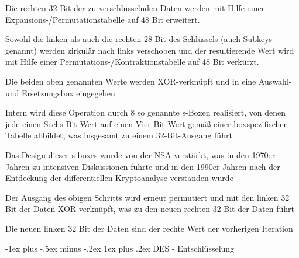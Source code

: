 \documentclass[a4paper]{article}
\makeatletter
\renewcommand{\subsubsection}{\@startsection{subsubsection}{3}{0mm}%
 {-1ex plus -.5ex minus -.2ex}%
 {1ex plus .2ex}%
 {\normalfont\small\bfseries}}
\makeatother
\begin{document}
\begin{multicols}{3}
      \begin{itemize*}
            \item Die rechten 32 Bit der zu verschlüsselnden Daten werden mit Hilfe
            einer Expansions-/Permutationstabelle auf 48 Bit erweitert.
            \item Sowohl die linken als auch die rechten 28 Bit des Schlüssels (auch
            Subkeys genannt) werden zirkulär nach links verschoben und der
            resultierende Wert wird mit Hilfe einer
            Permutations-/Kontraktionstabelle auf 48 Bit verkürzt.
            \item Die beiden oben genannten Werte werden XOR-verknüpft und in eine
            Auswahl- und Ersetzungsbox eingegeben
            \begin{itemize*}
                  \item Intern wird diese Operation durch 8 so genannte s-Boxen realisiert, von denen jede einen Sechs-Bit-Wert auf einen Vier-Bit-Wert gemäß einer boxspezifischen Tabelle abbildet, was insgesamt zu einem 32-Bit-Ausgang führt
                  \item Das Design dieser s-boxes wurde von der NSA verstärkt, was in den 1970er Jahren zu intensiven Diskussionen führte und in den 1990er Jahren nach der Entdeckung der differentiellen Kryptoanalyse verstanden wurde
            \end{itemize*}
            \item Der Ausgang des obigen Schritts wird erneut permutiert und mit den
            linken 32 Bit der Daten XOR-verknüpft, was zu den neuen rechten 32 Bit
            der Daten führt
            \item Die neuen linken 32 Bit der Daten sind der rechte Wert der vorherigen
            Iteration
      \end{itemize*}


      \subsubsection{DES - Entschlüsselung}


\end{multicols}
\end{document}
